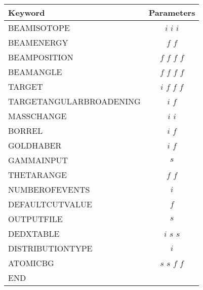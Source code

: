 \documentclass[12pt]{book}
\begin{document}
\begin{table}
  \centering
  \label{tab:EVENTGENERATORKEY}
  \begin{tabular}{|l||c|}
    \hline
    Keyword & Parameters \\
    \hline
    \hline
    BEAMISOTOPE             & $i$ $i$ $i$     \\
    BEAMENERGY              & $f$ $f$         \\
    BEAMPOSITION            & $f$ $f$ $f$ $f$ \\
    BEAMANGLE               & $f$ $f$ $f$ $f$ \\
    TARGET                  & $i$ $f$ $f$ $f$ \\
    TARGETANGULARBROADENING & $i$ $f$         \\
    MASSCHANGE              & $i$ $i$         \\
    BORREL                  & $i$ $f$         \\
    GOLDHABER               & $i$ $f$         \\
    GAMMAINPUT              & $s$             \\
    THETARANGE              & $f$ $f$         \\
    NUMBEROFEVENTS          & $i$             \\
    DEFAULTCUTVALUE         & $f$             \\
    OUTPUTFILE              & $s$             \\
    DEDXTABLE               & $i$ $s$ $s$     \\
    DISTRIBUTIONTYPE        & $i$             \\
    ATOMICBG                & $s$ $s$ $f$ $f$ \\
    END                     &                 \\
    \hline
  \end{tabular}
\end{table}
\end{document}
